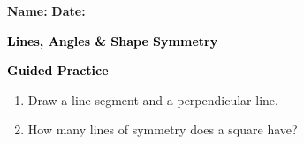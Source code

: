 \documentclass[12pt, letterpaper, fleqn]{article}
\begin{document}
\textbf{Name:} \underline{\hspace{5cm}}
\hfill
\textbf{Date:} \underline{\hspace{3cm}}\\

\begin{tcolorbox}[colback=customteal!20]
    \large\textcolor{black}{\textbf{Lines, Angles \& Shape Symmetry}}
\end{tcolorbox}
\newpage
\begin{tcolorbox}[colback=customteal!20]
    \large\textcolor{black}{\textbf{Guided Practice}}
\end{tcolorbox}
\begin{enumerate}[itemsep=3.5cm, leftmargin=0.6cm]
\item Draw a line segment and a perpendicular line.
\vspace{3cm}
\item How many lines of symmetry does a square have?
\end{enumerate}
\end{document}
